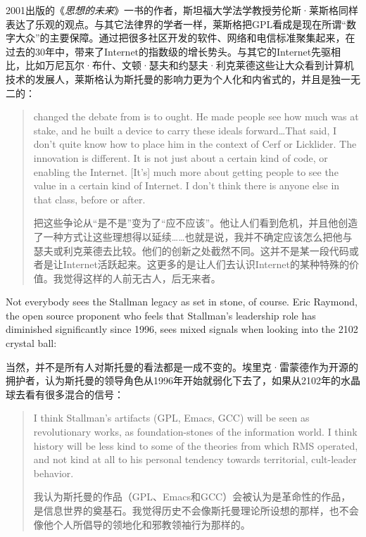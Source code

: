 \ifdefined\chs
2001出版的《\textit{思想的未来}》一书的作者，斯坦福大学法学教授劳伦斯·莱斯格同样表达了乐观的观点。与其它法律界的学者一样，莱斯格把GPL看成是现在所谓``数字大众''的主要保障。通过把很多社区开发的软件、网络和电信标准聚集起来，在过去的30年中，带来了Internet的指数级的增长势头。与其它的Internet先驱相比，比如万尼瓦尔·布什、文顿·瑟夫和约瑟夫·利克莱德这些让大众看到计算机技术的发展人，莱斯格认为斯托曼的影响力更为个人化和内省式的，并且是独一无二的：
\fi

\begin{quote}
\ifdefined\eng
[Stallman] changed the debate from is to ought. He made people see how much was at stake, and he built a device to carry these ideals forward\ldots That said, I don't quite know how to place him in the context of Cerf or Licklider. The innovation is different. It is not just about a certain kind of code, or enabling the Internet. [It's] much more about getting people to see the value in a certain kind of Internet. I don't think there is anyone else in that class, before or after.
\fi

\ifdefined\chs
[斯托曼]把这些争论从``是不是''变为了``应不应该''。他让人们看到危机，并且他创造了一种方式让这些理想得以延续……也就是说，我并不确定应该怎么把他与瑟夫或利克莱德去比较。他们的创新之处截然不同。这并不是某一段代码或者是让Internet活跃起来。这更多的是让人们去认识Internet的某种特殊的价值。我觉得这样的人前无古人，后无来者。
\fi
\end{quote}

\ifdefined\eng
Not everybody sees the Stallman legacy as set in stone, of course. Eric Raymond, the open source proponent who feels that Stallman's leadership role has diminished significantly since 1996, sees mixed signals when looking into the 2102 crystal ball:
\fi

\ifdefined\chs
当然，并不是所有人对斯托曼的看法都是一成不变的。埃里克·雷蒙德作为开源的拥护者，认为斯托曼的领导角色从1996年开始就弱化下去了，如果从2102年的水晶球去看有很多混合的信号：
\fi

\begin{quote}
\ifdefined\eng
I think Stallman's artifacts (GPL, Emacs, GCC) will be seen as revolutionary works, as foundation-stones of the information world. I think history will be less kind to some of the theories from which RMS operated, and not kind at all to his personal tendency towards territorial, cult-leader behavior.
\fi

\ifdefined\chs
我认为斯托曼的作品（GPL、Emacs和GCC）会被认为是革命性的作品，是信息世界的奠基石。我觉得历史不会像斯托曼理论所设想的那样，也不会像他个人所倡导的领地化和邪教领袖行为那样的。
\fi
\end{quote}

